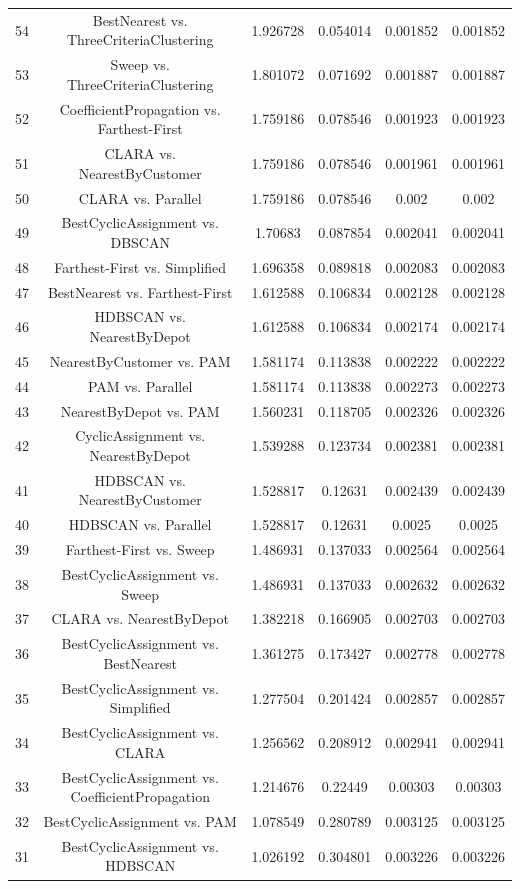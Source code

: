\documentclass[a4paper,10pt]{article}
\begin{document}
\begin{landscape}
\begin{table}[!htp]
\begin{tabular}{cccccc}
54&BestNearest vs. ThreeCriteriaClustering&1.926728&0.054014&0.001852&0.001852\\
53&Sweep vs. ThreeCriteriaClustering&1.801072&0.071692&0.001887&0.001887\\
52&CoefficientPropagation vs. Farthest-First&1.759186&0.078546&0.001923&0.001923\\
51&CLARA vs. NearestByCustomer&1.759186&0.078546&0.001961&0.001961\\
50&CLARA vs. Parallel&1.759186&0.078546&0.002&0.002\\
49&BestCyclicAssignment vs. DBSCAN&1.70683&0.087854&0.002041&0.002041\\
48&Farthest-First vs. Simplified&1.696358&0.089818&0.002083&0.002083\\
47&BestNearest vs. Farthest-First&1.612588&0.106834&0.002128&0.002128\\
46&HDBSCAN vs. NearestByDepot&1.612588&0.106834&0.002174&0.002174\\
45&NearestByCustomer vs. PAM&1.581174&0.113838&0.002222&0.002222\\
44&PAM vs. Parallel&1.581174&0.113838&0.002273&0.002273\\
43&NearestByDepot vs. PAM&1.560231&0.118705&0.002326&0.002326\\
42&CyclicAssignment vs. NearestByDepot&1.539288&0.123734&0.002381&0.002381\\
41&HDBSCAN vs. NearestByCustomer&1.528817&0.12631&0.002439&0.002439\\
40&HDBSCAN vs. Parallel&1.528817&0.12631&0.0025&0.0025\\
39&Farthest-First vs. Sweep&1.486931&0.137033&0.002564&0.002564\\
38&BestCyclicAssignment vs. Sweep&1.486931&0.137033&0.002632&0.002632\\
37&CLARA vs. NearestByDepot&1.382218&0.166905&0.002703&0.002703\\
36&BestCyclicAssignment vs. BestNearest&1.361275&0.173427&0.002778&0.002778\\
35&BestCyclicAssignment vs. Simplified&1.277504&0.201424&0.002857&0.002857\\
34&BestCyclicAssignment vs. CLARA&1.256562&0.208912&0.002941&0.002941\\
33&BestCyclicAssignment vs. CoefficientPropagation&1.214676&0.22449&0.00303&0.00303\\
32&BestCyclicAssignment vs. PAM&1.078549&0.280789&0.003125&0.003125\\
31&BestCyclicAssignment vs. HDBSCAN&1.026192&0.304801&0.003226&0.003226\\

\end{tabular}
\end{table}
\end{landscape}
\end{document}
